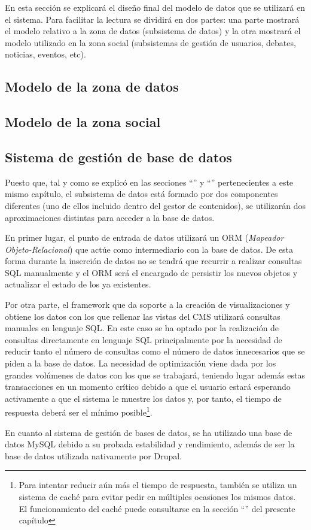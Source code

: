En esta sección se explicará el diseño final del modelo de datos que se utilizará en el sistema.  Para facilitar la lectura se dividirá en dos partes: una parte mostrará el modelo relativo a la zona de datos (subsistema de datos) y la otra mostrará el modelo utilizado en la zona social (subsistemas de gestión de usuarios, debates, noticias, eventos, etc).


\subsection{Modelo de la zona de datos}
\label{modelo_datos_zona_datos}



\subsection{Modelo de la zona social}
\label{modelo_datos_zona_social}



\subsection{Sistema de gestión de base de datos}
Puesto que, tal y como se explicó en las secciones ``'' y ``'' pertenecientes a este mismo capítulo, el subsistema de datos está formado por dos componentes diferentes (uno de ellos incluido dentro del gestor de contenidos), se utilizarán dos aproximaciones distintas para acceder a la base de datos.

En primer lugar, el punto de entrada de datos utilizará un ORM (\textit{Mapeador Objeto-Relacional}) que actúe como intermediario con la base de datos.  De esta forma  durante la inserción de datos no se tendrá que recurrir a realizar consultas SQL manualmente y el ORM será el encargado de persistir los nuevos objetos y actualizar el estado de los ya existentes.

Por otra parte, el framework que da soporte a la creación de visualizaciones y obtiene los datos con los que rellenar las vistas del CMS utilizará consultas manuales en lenguaje SQL.  En este caso se ha optado por la realización de consultas directamente en lenguaje SQL principalmente por la necesidad de reducir tanto el número de consultas como el número de datos innecesarios que se piden a la base de datos.  La necesidad de optimización viene dada por los grandes volúmenes de datos con los que se trabajará, teniendo lugar además estas transacciones en un momento crítico debido a que el usuario estará esperando activamente a que el sistema le muestre los datos y, por tanto, el tiempo de respuesta deberá ser el mínimo posible\footnote{Para intentar reducir aún más el tiempo de respuesta, también se utiliza un sistema de caché para evitar pedir en múltiples ocasiones los mismos datos.  El funcionamiento del caché puede consultarse en la sección ``'' del presente capítulo}.

En cuanto al sistema de gestión de bases de datos, se ha utilizado una base de datos MySQL debido a su probada estabilidad y rendimiento, además de ser la base de datos utilizada nativamente por Drupal.
